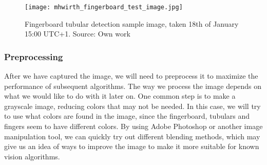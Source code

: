 \begin{figure}[ht]
    \centering
    \texttt{[image: mhwirth\_fingerboard\_test\_image.jpg]}
    \caption{Fingerboard tubular detection sample image, taken 18th of January 15:00 UTC+1. Source: Own work}
    \label{fig:mhwirth_fingerboard_test_image}
\end{figure}
\FloatBarrier


\subsubsection{Preprocessing}
After we have captured the image, we will need to preprocess it to maximize the performance of subsequent algorithms. The way we process the image depends on what we would like to do with it later on. One common step is to make a grayscale image, reducing colors that may not be needed. In this case, we will try to use what colors are found in the image, since the fingerboard, tubulars and fingers seem to have different colors. By using Adobe Photoshop or another image manipulation tool, we can quickly try out different blending methods, which may give us an idea of ways to improve the image to make it more suitable for known vision algorithms.

